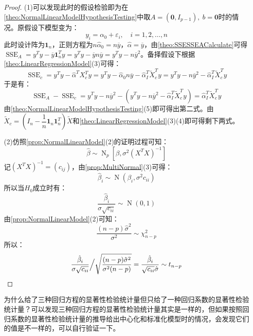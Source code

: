 \begin{proof}
	(1)可以发现此时的假设检验即为在\cref{theo:NormalLinearModelHypothesisTesting}中取$A=(\mathbf{0},I_{p-1}),\;b=\mathbf{0}$时的情况。原假设下模型变为：
	\begin{equation*}
		y_i=\alpha_0+\varepsilon_i,\quad i=1,2,\dots,n
	\end{equation*}
		此时设计阵为$\mathbf{1}_n$，正则方程为$n\hat{\alpha}_0=n\overline{y}$，$\hat{\alpha}=\overline{y}$，由\cref{theo:SSESSEACalculate}可得$\operatorname{SSE}_A=y^Ty-\overline{y}\mathbf{1}_n^Ty=y^Ty-\overline{y}n\overline{y}=y^Ty-n\overline{y}^2$。备择假设下根据\cref{theo:LinearRegressionModel}(3)可得：
	\begin{equation*}
		\operatorname{SSE}_c=y^Ty-\hat{\alpha}^TX_c^Ty=y^Ty-\hat{\alpha}_0n\overline{y}-\hat{\alpha}_I^T\tilde{X}_c^Ty=y^Ty-n\overline{y}^2-\hat{\alpha}_I^T\tilde{X}_c^Ty
	\end{equation*}
	于是有：
	\begin{equation*}
		\operatorname{SSE}_A-\operatorname{SSE}_c=y^Ty-n\overline{y}^2-(y^Ty-n\overline{y}^2-\hat{\alpha}_I^T\tilde{X}_c^Ty)=\hat{\alpha}_I^T\tilde{X}_c^Ty
	\end{equation*}
	由\cref{theo:NormalLinearModelHypothesisTesting}(5)即可得出第二式。由$\tilde{X}_c=\left(I_n-\dfrac{1}{n}\mathbf{1}_n\mathbf{1}_n^T\right)\tilde{X}$和\cref{theo:LinearRegressionModel}(3)(4)即可得剩下两式。\par
	(2)仿照\cref{prop:NormalLinearModel}(2)的证明过程可知：
	\begin{equation*}
		\hat{\beta}\sim\operatorname{N}_p[\beta,\sigma^2(X^TX)^{-1}]
	\end{equation*}
	记$(X^TX)^{-1}=(c_{ij})$，由\cref{prop:MultiNormal}(3)可得：
	\begin{equation*}
		\hat{\beta}_i\sim\operatorname{N}(\beta_i,\sigma^2c_{ii})
	\end{equation*}
	所以当$H_0$成立时有：
	\begin{equation*}
		\frac{\hat{\beta}_i}{\sigma\sqrt{c_{ii}}}\sim\operatorname{N}(0,1)
	\end{equation*}
	由\cref{prop:NormalLinearModel}(2)可知：
	\begin{equation*}
		\frac{(n-p)\hat{\sigma}^2}{\sigma^2}\sim\chi_{n-p}^2
	\end{equation*}
	所以：
	\begin{equation*}
		\frac{\hat{\beta}_i}{\sigma\sqrt{c_{ii}}}\Big/\sqrt{\frac{(n-p)\hat{\sigma}^2}{\sigma^2(n-p)}}=\frac{\hat{\beta}_i}{\sqrt{c_{ii}}\hat{\sigma}}\sim t_{n-p}\qedhere
	\end{equation*}
\end{proof}
\begin{note}
	为什么给了三种回归方程的显著性检验统计量但只给了一种回归系数的显著性检验统计量？可以发现三种回归方程的显著性检验统计量其实是一样的，但如果按照回归系数的显著性检验统计量的推导给出中心化和标准化模型时的情况，会发现它们的值是不一样的，可以自行验证一下。
\end{note}
